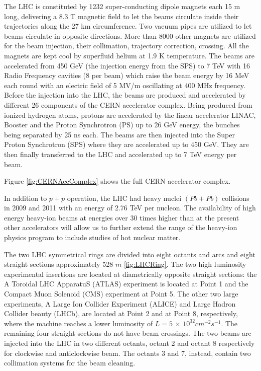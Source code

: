 The LHC is constituted by 1232 super-conducting dipole magnets each 15 m long, 
delivering a 8.3 T magnetic field to let the beams circulate inside their trajectories 
along the 27 km circumference. Two vacuum pipes are utilized to let beams circulate 
in opposite directions. 
More than 8000 other magnets are utilized for the beam 
injection, their collimation, trajectory correction, crossing. All the magnets are kept 
cool by superfluid helium at 1.9 K temperature. The beams are accelerated from 
450 GeV (the injection energy from the SPS) to 7 TeV with 16 Radio Frequency 
cavities (8 per beam) which raise the beam energy by 16 MeV each round with an 
electric field of 5 MV/m oscillating at 400 MHz frequency. Before the injection into 
the LHC, the beams are produced and accelerated by different 26 components of the 
CERN accelerator complex. Being produced from ionized hydrogen atoms, protons 
are accelerated by the linear accelerator LINAC, Booster and the Proton Synchrotron 
(PS) up to 26 GeV energy, the bunches being separated by 25 ns each. The beams are 
then injected into the Super Proton Synchrotron (SPS) where they are accelerated 
up to 450 GeV. They are then finally transferred to the LHC and accelerated up to 
7 TeV energy per beam.


Figure \ref{fig:CERNAccComplex} shows the full CERN accelerator complex.


In addition to $p + p$ operation, the LHC had 
heavy nuclei $(Pb + Pb)$ collisions in 2009 and 2011 
 with an energy of 2.76 TeV per nucleon. The availability of high energy heavy-ion beams at energies
over 30 times higher than at the present other accelerators will allow us to
further extend the range of the heavy-ion physics program to include studies
of hot nuclear matter.


The two LHC symmetrical rings are divided into eight octants and arcs and
eight straight sections approximately 528 $m$ \ref{fig:LHCRing}. The two high luminosity
experimental insertions are located at diametrically opposite straight
sections: the A Toroidal LHC ApparatuS (ATLAS) experiment is located
at Point 1 and the Compact Muon Solenoid (CMS) experiment
at Point 5. The other two large experiments, A Large Ion Collider Experiment
(ALICE) and Large Hadron Collider beauty (LHCb), are located
at Point 2 and at Point 8, respectively, where the machine reaches a lower
luminosity of $L = 5 \, \times \,10^{32} cm^{-2}s^{-1}$. The remaining four straight sections do
not have beam crossings. The two beams are injected into the LHC in two
different octants, octant 2 and octant 8 respectively for clockwise and anticlockwise
beam. The octants 3 and 7, instead, contain two collimation systems
for the beam cleaning. 



